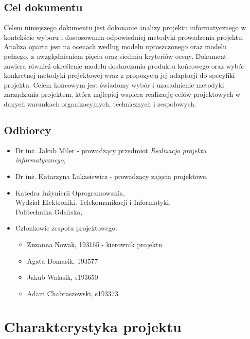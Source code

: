 \documentclass[12pt,a4paper,colorlinks=true,linkcolor=NavyBlue,citecolor=red,urlcolor=NavyBlue]{book}
\begin{document}
\section{Cel dokumentu}
Celem niniejszego dokumentu jest dokonanie analizy projektu informatycznego w kontekście wyboru i dostosowania odpowiedniej metodyki prowadzenia projektu. Analiza oparta jest na ocenach według modelu uproszczonego oraz modelu pełnego, z uwzględnieniem pięciu oraz siedmiu kryteriów oceny. Dokument zawiera również określenie modelu dostarczania produktu końcowego oraz wybór konkretnej metodyki projektowej wraz z propozycją jej adaptacji do specyfiki projektu. 
Celem końcowym jest świadomy wybór i uzasadnienie metodyki zarządzania projektem, która najlepiej wspiera realizację celów projektowych w danych warunkach organizacyjnych, technicznych i zespołowych.

\section{Odbiorcy}

\begin{itemize}
    \item Dr inż. Jakub Miler - prowadzący przedmiot \textit{Realizacja projektu informatycznego},
    \item Dr inż. Katarzyna Łukasiewicz - prowadzący zajęcia projektowe,
    \item Katedra Inżynierii Oprogramowania, \\[2mm] 
Wydział Elektroniki, Telekomunikacji i Informatyki, \\[2mm]  
Politechnika Gdańska,
    \item Członkowie zespołu projektowego:
    \begin{itemize}
        \item[] Zuzanna Nowak, 193165 - kierownik projektu
        \item[] Agata Domasik, 193577
        \item[] Jakub Walasik, s193650
        \item[] Adam Chabraszewski, s193373
    \end{itemize}
\end{itemize}

\clearpage

\chapter{Charakterystyka projektu}
\end{document}
